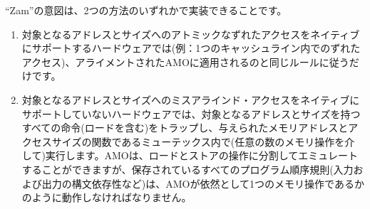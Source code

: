\begin{commentary}
  \begin{comment}
    The intention of ``Zam'' is that it can be implemented in one of two ways:
  \end{comment}
  ``Zam''の意図は、2つの方法のいずれかで実装できることです。
  \begin{comment}
  \begin{enumerate}
    \item On hardware that natively supports atomic misaligned accesses to the address and size in question (e.g., for misaligned accesses within a single cache line): by simply following the same rules that would be applied for aligned AMOs.
    \item On hardware that does not natively support misaligned accesses to the address and size in question: by trapping on all instructions (including loads) with that address and size and executing them (via any number of memory operations) inside a mutex that is a function of the given memory address and access size.  AMOs may be emulated by splitting them into separate load and store operations, but all preserved program order rules (e.g., incoming and outgoing syntactic dependencies) must behave as if the AMO is still a single memory operation.
  \end{enumerate}
  \end{comment}

  \begin{enumerate}
  \item 対象となるアドレスとサイズへのアトミックなずれたアクセスをネイティブにサポートするハードウェアでは(例：1つのキャッシュライン内でのずれたアクセス)、アライメントされたAMOに適用されるのと同じルールに従うだけです。
  \item 対象となるアドレスとサイズへのミスアラインド・アクセスをネイティブにサポートしていないハードウェアでは、対象となるアドレスとサイズを持つすべての命令(ロードを含む)をトラップし、与えられたメモリアドレスとアクセスサイズの関数であるミューテックス内で(任意の数のメモリ操作を介して)実行します。AMOは、ロードとストアの操作に分割してエミュレートすることができますが、保存されているすべてのプログラム順序規則(入力および出力の構文依存性など)は、AMOが依然として1つのメモリ操作であるかのように動作しなければなりません。
  \end{enumerate}
\end{commentary}
